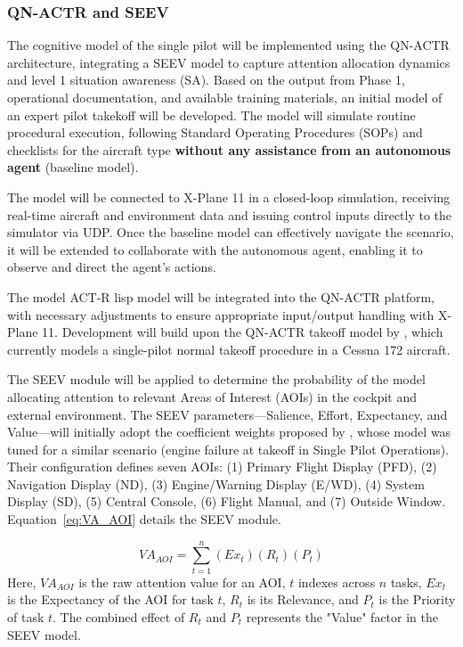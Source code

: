 \documentclass[12pt,a4paper]{article} %
\begin{document}
	\subsubsection{QN-ACTR and SEEV}
	\label{qn-actr-seev}
	The cognitive model of the single pilot will be implemented using the QN-ACTR architecture, integrating a SEEV model to capture attention allocation dynamics and level 1 situation awareness (SA). Based on the output from Phase 1, operational documentation, and available training materials, an initial model of an expert pilot takekoff will be developed. The model will simulate routine procedural execution, following Standard Operating Procedures (SOPs) and checklists for the aircraft type \textbf{without any assistance from an autonomous agent} (baseline model).

	The model will be connected to X-Plane 11 in a closed-loop simulation, receiving real-time aircraft and environment data and issuing control inputs directly to the simulator via UDP. Once the baseline model can effectively navigate the scenario, it will be extended to collaborate with the autonomous agent, enabling it to observe and direct the agent's actions.
	
	The model ACT-R lisp model will be integrated into the QN-ACTR platform, with necessary adjustments to ensure appropriate input/output handling with X-Plane 11. Development will build upon the QN-ACTR takeoff model by \textcite{xu_modeling_2021}, which currently models a single-pilot normal takeoff procedure in a Cessna 172 aircraft.
	
	The SEEV module will be applied to determine the probability of the model allocating attention to relevant Areas of Interest (AOIs) in the cockpit and external environment. The SEEV parameters—Salience, Effort, Expectancy, and Value—will initially adopt the coefficient weights proposed by \textcite{wang_real-time_2024}, whose model was tuned for a similar scenario (engine failure at takeoff in Single Pilot Operations). Their configuration defines seven AOIs: (1) Primary Flight Display (PFD), (2) Navigation Display (ND), (3) Engine/Warning Display (E/WD), (4) System Display (SD), (5) Central Console, (6) Flight Manual, and (7) Outside Window. Equation~\ref{eq:VA_AOI} details the SEEV module.
	
	\begin{equation}
		VA_{AOI} = \sum_{t=1}^{n} (Ex_t) (R_t) (P_t)
		\label{eq:VA_AOI}
	\end{equation}
	Here, $VA_{AOI}$ is the raw attention value for an AOI, $t$ indexes across $n$ tasks, $Ex_t$ is the Expectancy of the AOI for task $t$, $R_t$ is its Relevance, and $P_t$ is the Priority of task $t$. The combined effect of $R_t$ and $P_t$ represents the "Value" factor in the SEEV model.
	
\end{document}
